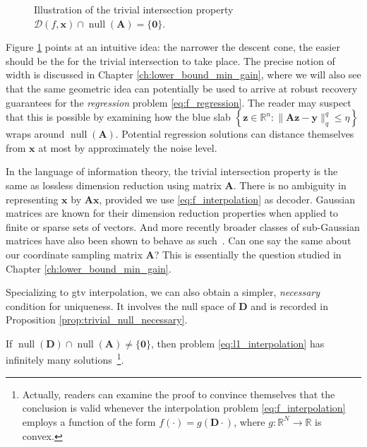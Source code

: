 \begin{figure}[H]
    \centering
    
    \caption[The trivial intersection property]{Illustration of the trivial intersection property $\mathcal{D}(f, \mathbf{x}) \cap \operatorname{null} \left ( \mathbf{A} \right ) = \{ \mathbf{0} \}$.}
    \label{fig:illustration_trivial_intersection}
\end{figure}

Figure \ref{fig:illustration_trivial_intersection} points at an intuitive idea: the narrower the descent cone, the easier should be the for the trivial intersection to take place. The precise notion of width is discussed in Chapter \ref{ch:lower_bound_min_gain}, where we will also see that the same geometric idea can potentially be used to arrive at robust recovery guarantees for the \emph{regression} problem \eqref{eq:f_regression}. The reader may suspect that this is possible by examining how the blue slab $\left \{ \mathbf{z} \in \mathbb{R}^{n} : \|\mathbf{Az} - \mathbf{y}\|_q^q \leq \eta \right\}$ wraps around $\operatorname{null} \left ( \mathbf{A} \right )$. Potential regression solutions can distance themselves from $\mathbf{x}$ at most by approximately the noise level.

In the language of information theory, the trivial intersection property is the same as lossless dimension reduction using matrix $\mathbf{A}$. There is no ambiguity in representing $\mathbf{x}$ by $\mathbf{Ax}$, provided we use \eqref{eq:f_interpolation} as decoder. Gaussian matrices are known for their dimension reduction properties when applied to finite \cite{johnson1984} or sparse \cite{foucart2013} sets of vectors. And more recently broader classes of sub-Gaussian matrices have also been shown to behave as such~\cite{oymak2018}. Can one say the same about our coordinate sampling matrix $\mathbf{A}$? This is essentially the question studied in Chapter \ref{ch:lower_bound_min_gain}.

Specializing to \acrlong{gtv} interpolation, we can also obtain a simpler, \emph{necessary} condition for uniqueness. It involves the null space of $\mathbf{D}$ and is recorded in Proposition \ref{prop:trivial_null_necessary}.

\begin{proposition}\label{prop:trivial_null_necessary}
    If $\operatorname{null} \left ( \mathbf{D} \right ) \cap \operatorname{null} \left ( \mathbf{A} \right ) \neq \{ \mathbf{0} \}$, then problem \eqref{eq:l1_interpolation} has infinitely many solutions~\footnote{Actually, readers can examine the proof to convince themselves that the conclusion is valid whenever the interpolation problem \eqref{eq:f_interpolation} employs a function of the form $f(\cdot) = g(\mathbf{D} \cdot)$, where $g : \mathbb{R}^{N} \to \mathbb{R}$ is convex.}.
\end{proposition}

